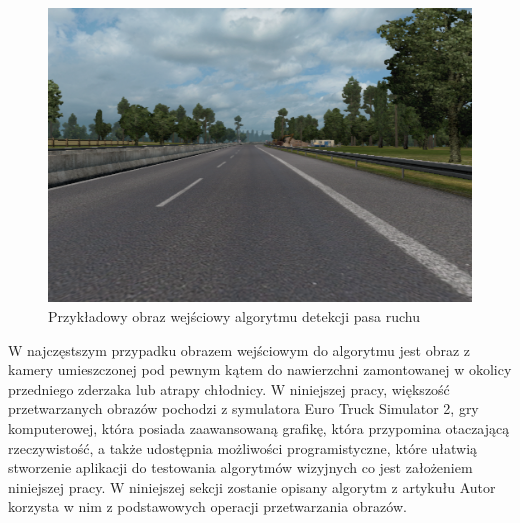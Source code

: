 \begin{figure}
  \centering
  \includegraphics[width=12cm]{img/input.png}
  \caption{Przykładowy obraz wejściowy algorytmu detekcji pasa ruchu}
  \label{fig:inputimg}
\end{figure}

W najczęstszym przypadku obrazem wejściowym do algorytmu jest obraz z kamery umieszczonej pod pewnym kątem do nawierzchni zamontowanej w okolicy przedniego zderzaka lub atrapy chłodnicy. W niniejszej pracy, większość przetwarzanych obrazów pochodzi z symulatora Euro Truck Simulator 2, gry komputerowej, która posiada zaawansowaną grafikę, która przypomina otaczającą rzeczywistość, a także udostępnia możliwości programistyczne, które ułatwią stworzenie aplikacji do testowania algorytmów wizyjnych co jest założeniem niniejszej pracy. W niniejszej sekcji zostanie opisany algorytm z artykułu \cite{T3}
Autor korzysta w nim z podstawowych operacji przetwarzania obrazów. 



